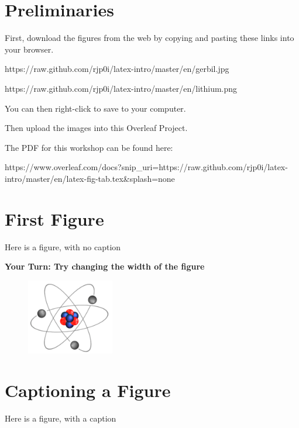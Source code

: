\documentclass{article}
\begin{document}
\section{Preliminaries}
First, download the figures from the web by copying and pasting these links into your browser.
\bigskip

https://raw.github.com/rjp0i/latex-intro/master/en/gerbil.jpg

https://raw.github.com/rjp0i/latex-intro/master/en/lithium.png
\bigskip

You can then right-click to save to your computer.
\medskip

Then upload the images into this Overleaf Project.


The PDF for this workshop can be found here:

https://www.overleaf.com/docs?snip_uri=https://raw.github.com/rjp0i/latex-intro/master/en/latex-fig-tab.tex&splash=none

\clearpage
\section{First Figure}

Here is a figure, with no caption
\medskip

{\bf Your Turn: Try changing the width of the figure}

\begin{figure}
\centering   %
\includegraphics[width=1.5in]{lithium.png} %
\end{figure}
\clearpage
\section{Captioning a Figure}
Here is a figure, with a caption
\end{document}
